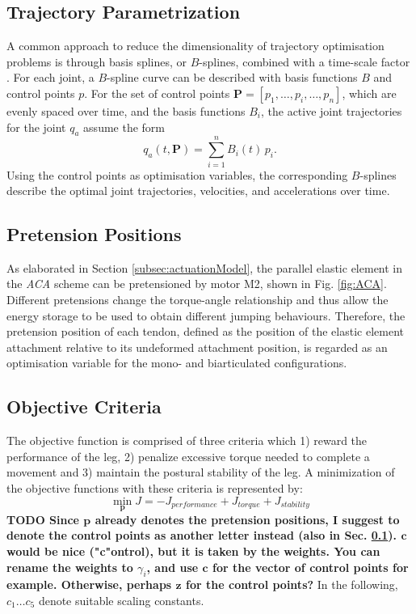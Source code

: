 \documentclass[letterpaper, 10 pt, conference]{ieeeconf}  %
\begin{document}
\subsection{Trajectory Parametrization} 
\label{subsec:trajectoryParametrization}
A common approach to reduce the dimensionality of trajectory optimisation problems is through basis splines, or $B$-splines, combined with a time-scale factor \cite{ude2000planning,babivc2009biarticulated,wang1999weight,albro2001optimal}. For each joint, a $B$-spline curve can be described with basis functions $B$ and control points $p$. For the set of control points $\mathbf{P}=\left[p_1,\dots,p_i,\dots,p_n\right]$, which are evenly spaced over time, and the basis functions $B_i$, the active joint trajectories for the joint $q_a$ assume the form
\begin{equation}
	q_a(t,\mathbf{P}) = \sum_{i=1}^{n} B_i (t) \, p_i.
\end{equation}
Using the control points as optimisation variables, the corresponding $B$-splines describe the optimal joint trajectories, velocities, and accelerations over time. 

\subsection{Pretension Positions} 
\label{subsec:pretensionPositions}
As elaborated in Section \ref{subsec:actuationModel}, the parallel elastic element in the \textit{ACA} scheme can be pretensioned by motor M2, shown in Fig. \ref{fig:ACA}. Different pretensions change the torque-angle relationship and thus allow the energy storage to be used to obtain different jumping behaviours. Therefore, the pretension position of each tendon, defined as the position of the elastic element attachment relative to its undeformed attachment position, is regarded as an optimisation variable for the mono- and biarticulated configurations.

\subsection{Objective Criteria} 
\label{subsec:objectiveCriteria}
The objective function is comprised of three criteria which 1) reward the performance of the leg, 2) penalize excessive torque needed to complete a movement and 3) maintain the postural stability of the leg. A minimization of the objective functions with these criteria is represented by:
\begin{equation}
	\min_{\mathbf{p}} J = -J_{performance} + J_{torque} + J_{stability}
\end{equation}
\textbf{TODO Since $\mathbf{p}$ already denotes the pretension positions, I suggest to denote the control points as another letter instead (also in Sec. \ref{subsec:trajectoryParametrization}). $\mathbf{c}$ would be nice ("c"ontrol), but it is taken by the weights. You can rename the weights to $\gamma_i$, and use $\mathbf{c}$ for the vector of control points for example. Otherwise, perhaps $\mathbf{z}$ for the control points?}
In the following, $c_1 \dots c_5$ denote suitable scaling constants.
\end{document}
